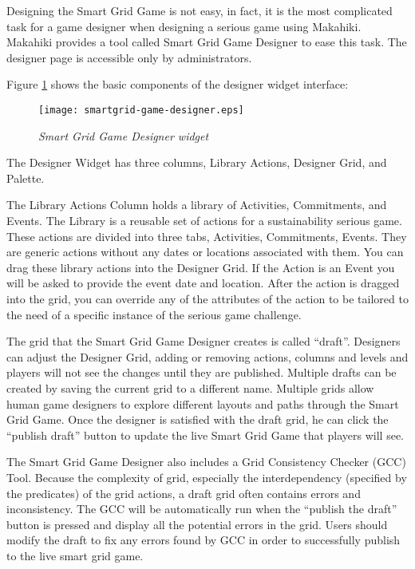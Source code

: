 Designing the Smart Grid Game is not easy, in fact, it is the most complicated task for a game designer when designing a serious game using Makahiki. Makahiki provides a tool called Smart Grid Game Designer to ease this task. The designer page is accessible only by administrators. 

Figure \ref{fig:game-designer} shows the basic components of the designer widget interface:

\begin{figure}[!ht]
  \center
  \texttt{[image: smartgrid-game-designer.eps]}
  \caption{\em Smart Grid Game Designer widget}
  \label{fig:game-designer}
\end{figure}

The Designer Widget has three columns, Library Actions, Designer Grid, and Palette. 

The Library Actions Column holds a library of Activities, Commitments, and Events. The Library is a reusable set of actions for a sustainability serious game. These actions are divided into three tabs, Activities, Commitments, Events. They are generic actions without any dates or locations associated with them. You can drag these library actions into the Designer Grid. If the Action is an Event you will be asked to provide the event date and location. After the action is dragged into the grid, you can override any of the attributes of the action to be tailored to the need of a specific instance of the serious game challenge.
 
The grid that the Smart Grid Game Designer creates is called ``draft''. Designers can adjust the Designer Grid, adding or removing actions, columns and levels and players will not see the changes until they are published. Multiple drafts can be created by saving the current grid to a different name. Multiple grids allow human game designers to explore different layouts and paths through the Smart Grid Game. Once the designer is satisfied with the draft grid, he can click the ``publish draft'' button to update the live Smart Grid Game that players will see.

The Smart Grid Game Designer also includes a Grid Consistency Checker (GCC) Tool. Because the complexity of grid, especially the interdependency (specified by the predicates) of the grid actions, a draft grid often contains errors and inconsistency. The GCC will be automatically run when the ``publish the draft'' button is pressed and display all the potential errors in the grid. Users should modify the draft to fix any errors found by GCC in order to successfully publish to the live smart grid game. 

